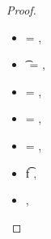\begin{lemma}
\begin{proof}
\begin{case}[T-App]
  \begin{itemize}
    \item
  \e{} = { {}},
    \item
  \t{} = {
                      {}
                      {\x{}}},
    \item
  {\thenprop {\prop{}}} = 
                 {
                              {}
                              {\x{}}},
    \item
  {\elseprop {\prop{}}} = 
                 {
                              {}
                              {\x{}}},
    \item
  \object{} = {
                           {}
                           {\x{}}},
    \item
  \judgement {\propenv{}} {} {\ArrowOne {\x{}} {\s{}}
                                                       {\t{f}}
                                                       {
                                                                   {}}
                                                       {}}
                {
                            {}}
                {},
    \item
  \judgement {\propenv{}}
                 {} {\s{}}
                 {
                             {}}
                 {},
  \end{itemize}

\end{case}
\end{proof}
\end{lemma}
